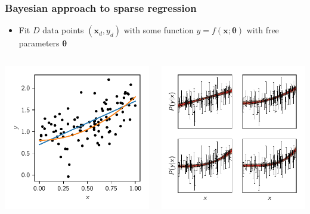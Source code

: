 \documentclass[%
    9pt,
]{beamer}
\newcommand{\vect}[1]{\mathbf{#1}}
\newcommand{\bg}[1]{\mathbf{#1}}
\begin{document}
\begin{frame}
    \frametitle{Bayesian approach to sparse regression}
    \begin{itemize}
        \item Fit $D$ data points $(\vect{x}_d,y_d)$ with some function $y=f(\vect{x};\bg{\theta})$ with free parameters $\bg{\theta}$
    \end{itemize}

    \begin{columns}
        \begin{column}{0.25\textwidth}
            \includegraphics[width=\textwidth]{figures/data_points.pdf}
        \end{column}
        \begin{column}{0.25\textwidth}
            \includegraphics[width=\textwidth]{figures/fgivenx.pdf}

\end{column}
\end{columns}
\end{frame}
\end{document}
